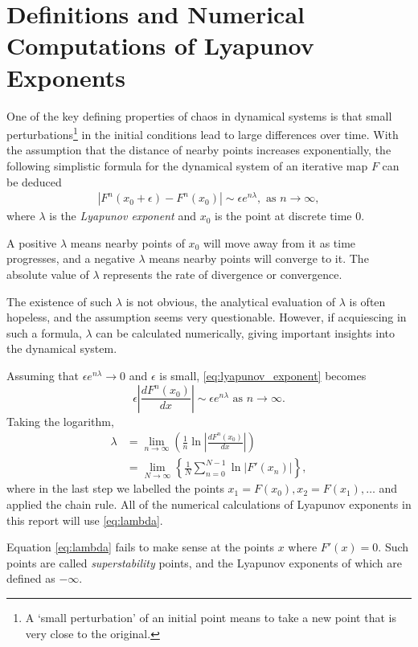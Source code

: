 \section{Definitions and Numerical Computations of Lyapunov Exponents}

One of the key defining properties of chaos in dynamical systems is that small perturbations\footnote{A `small perturbation' of an initial point means to take a new point that is very close to the original.} in the initial conditions lead to large differences over time.
With the assumption that the distance of nearby points increases exponentially, the following simplistic formula for the dynamical system of an iterative map $F$ can be deduced
\begin{align}\label{eq:lyapunov_exponent}
    \left|F^n(x_0+\epsilon)-F^n(x_0)\right| \sim \epsilon e^{n \lambda}, \text{ as } n \rightarrow \infty,
\end{align}
where $\lambda$ is the \emph{Lyapunov exponent} \cite{nonlinear_system}\cite{lyapunov} and $x_0$ is the point at discrete time $0$.

A positive $\lambda$ means nearby points of $x_0$ will move away from it as time progresses, and a negative $\lambda$ means nearby points will converge to it. 
The absolute value of $\lambda$ represents the rate of divergence or convergence.

The existence of such $\lambda$ is not obvious, the analytical evaluation of $\lambda$ is often hopeless, and the assumption seems very questionable.
However, if acquiescing in such a formula, $\lambda$ can be calculated numerically, giving important insights into the dynamical system. 

Assuming that $\epsilon e^{n \lambda} \to 0$ and $\epsilon$ is small, \eqref{eq:lyapunov_exponent} becomes
$$
\epsilon \left| \frac{dF^n(x_0)}{dx} \right| \sim \epsilon e^{n \lambda} \text{ as } n \rightarrow \infty.
$$
Taking the logarithm,
\begin{align}
    \lambda 
    &= \lim_{n \to \infty}\left(\frac{1}{n}\ln{\left|\frac{dF^n(x_0)}{dx}\right|}\right)  \\
    &= \lim_{N \to \infty}\left\{\frac{1}{N}\sum_{n=0}^{N-1}\ln{|F'(x_n)|}\right\}  \label{eq:lambda},
\end{align}
where in the last step we labelled the points $x_1 = F(x_0), x_2 = F(x_1), \dots$ and applied the chain rule.
All of the numerical calculations of Lyapunov exponents in this report will use \eqref{eq:lambda}.

Equation \eqref{eq:lambda} fails to make sense at the points $x$ where $F'(x) = 0$.
Such points are called \emph{superstability} points, and the Lyapunov exponents of which are defined as $- \infty$.

